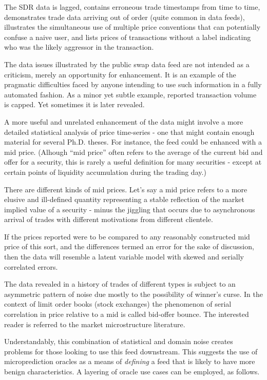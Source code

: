 The SDR data is lagged, contains erroneous trade timestamps from time to time, demonstrates trade data arriving out of order (quite common in data feeds), illustrates the simultaneous use of multiple price conventions that can potentially confuse a naive user, and lists prices of transactions without a label indicating who was the likely aggressor in the transaction.

The data issues illustrated by the public swap data feed are not intended as a criticism, merely an opportunity for enhancement. It is an example of the pragmatic difficulties faced by anyone intending to use such information in a fully automated fashion. As a minor yet subtle example, reported transaction volume is capped. Yet sometimes it is later revealed. 

A more useful and unrelated enhancement of the data might involve a more detailed statistical analysis of price time-series - one that might contain enough material for several Ph.D. theses. For instance, the feed could be enhanced with a mid price. (Alhough ``mid price'' often refers to the average of the current bid and offer for a security, this is rarely a useful definition for many securities - except at certain points of liquidity accumulation during the trading day.)

There are different kinds of mid prices. Let's say a mid price refers to a more elusive and ill-defined quantity representing a stable reflection of the market implied value of a security - minus the jiggling that occurs due to asynchronous arrival of trades with different motivations from different clientele.

If the prices reported were to be compared to any reasonably constructed mid price of this sort, and the differences termed an error for the sake of discussion, then the data will resemble a latent variable model with skewed and serially correlated errors.


The data revealed in a history of trades of different types is subject to an asymmetric pattern of noise due mostly to the possibility of winner's curse. In the context of limit order books (stock exchanges) the phenomenon of serial correlation in price relative to a mid is called bid-offer bounce. The interested reader is referred to the market microstructure literature. 

Understandably, this combination of statistical and domain noise creates problems for those looking to use this feed downstream. This suggests the use of microprediction oracles as a means of {\em defining} a feed that is likely to have more benign characteristics. A layering of oracle use cases can be employed, as follows.  


